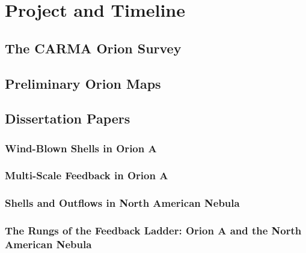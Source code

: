 \section{Project and Timeline}
    \subsection{The CARMA Orion Survey}

    \subsection{Preliminary Orion Maps}

    \subsection{Dissertation Papers}
        \subsubsection{Wind-Blown Shells in Orion A}
        \subsubsection{Multi-Scale Feedback in Orion A}
        \subsubsection{Shells and Outflows in North American Nebula}
        \subsubsection{The Rungs of the Feedback Ladder: Orion A and the North American Nebula}
    
    


  
  